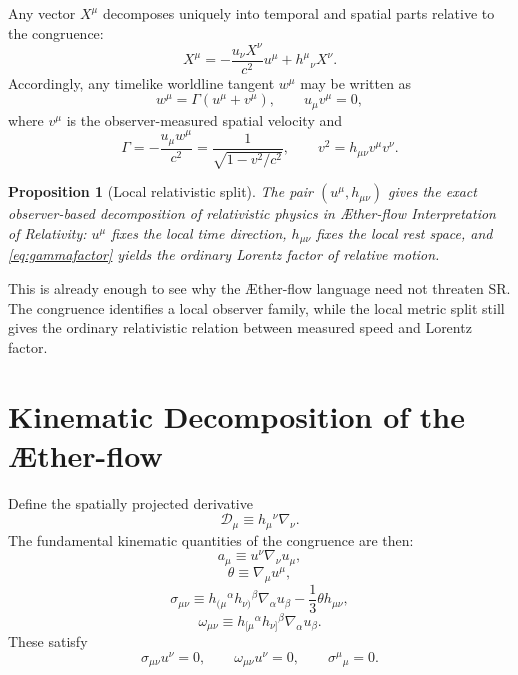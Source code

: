 \documentclass[11pt]{article}
\newcommand{\Aflow}{\AE{}ther-flow}
\newcommand{\TheoryName}{\Aflow{} Interpretation of Relativity}
\newcommand{\Proj}{\mathcal{D}}
\newtheorem{proposition}{Proposition}
\begin{document}
Any vector \(X^\mu\) decomposes uniquely into temporal and spatial parts relative to the congruence:
\begin{equation}
X^\mu
=
-\frac{u_\nu X^\nu}{c^2}u^\mu
+
h^\mu{}_{\nu}X^\nu.
\label{eq:vectordecomp}
\end{equation}
Accordingly, any timelike worldline tangent \(w^\mu\) may be written as
\begin{equation}
w^\mu
=
\Gamma\left(u^\mu+v^\mu\right),
\qquad
u_\mu v^\mu=0,
\label{eq:reldecomp}
\end{equation}
where \(v^\mu\) is the observer-measured spatial velocity and
\begin{equation}
\Gamma
=
-\frac{u_\mu w^\mu}{c^2}
=
\frac{1}{\sqrt{1-v^2/c^2}},
\qquad
v^2=h_{\mu\nu}v^\mu v^\nu.
\label{eq:gammafactor}
\end{equation}

\begin{proposition}[Local relativistic split]
The pair \((u^\mu,h_{\mu\nu})\) gives the exact observer-based decomposition of relativistic physics in \TheoryName{}: \(u^\mu\) fixes the local time direction, \(h_{\mu\nu}\) fixes the local rest space, and \eqref{eq:gammafactor} yields the ordinary Lorentz factor of relative motion.
\end{proposition}

This is already enough to see why the \Aflow{} language need not threaten SR. The congruence identifies a local observer family, while the local metric split still gives the ordinary relativistic relation between measured speed and Lorentz factor.

\section{Kinematic Decomposition of the \Aflow{}}

Define the spatially projected derivative
\begin{equation}
\Proj_\mu \equiv h_\mu{}^\nu \nabla_\nu.
\label{eq:projectedderivative}
\end{equation}
The fundamental kinematic quantities of the congruence are then:
\begin{equation}
a_\mu \equiv u^\nu \nabla_\nu u_\mu,
\label{eq:acceleration}
\end{equation}
\begin{equation}
\theta \equiv \nabla_\mu u^\mu,
\label{eq:expansion}
\end{equation}
\begin{equation}
\sigma_{\mu\nu}
\equiv
h_{(\mu}{}^\alpha h_{\nu)}{}^\beta \nabla_\alpha u_\beta
-\frac{1}{3}\theta h_{\mu\nu},
\label{eq:shear}
\end{equation}
\begin{equation}
\omega_{\mu\nu}
\equiv
h_{[\mu}{}^\alpha h_{\nu]}{}^\beta \nabla_\alpha u_\beta.
\label{eq:vorticity}
\end{equation}
These satisfy
\begin{equation}
\sigma_{\mu\nu}u^\nu = 0,
\qquad
\omega_{\mu\nu}u^\nu = 0,
\qquad
\sigma^\mu{}_\mu = 0.
\label{eq:kinematicprops}
\end{equation}
\end{document}
